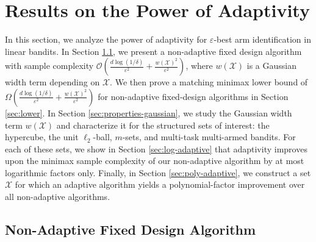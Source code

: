 

\section{Results on the Power of Adaptivity}\label{sec:non-adaptive}
In this section, we analyze the power of adaptivity for $\varepsilon$-best arm identification in linear bandits. In Section \ref{sec:upper}, we present a non-adaptive fixed design algorithm with sample complexity $\mathcal{O}\!\left(\frac{d\log(1/\delta)}{\varepsilon^2}+\frac{w(\mathcal{X})^2}{\varepsilon^2}\right)$, where $w(\mathcal{X})$ is a Gaussian width term depending on $\mathcal{X}$. We then prove a matching minimax lower bound of $\Omega\!\left(\frac{d\log(1/\delta)}{\varepsilon^2}+\frac{w(\mathcal{X})^2}{\varepsilon^2}\right)$ for non-adaptive fixed-design algorithms in Section \ref{sec:lower}. In Section \ref{sec:properties-gaussian}, we study the Gaussian width term $w(\mathcal{X})$ and characterize it for the structured sets of interest: the hypercube, the unit $\ell_2$-ball, $m$-sets, and multi-task multi-armed bandits. For each of these sets, we show in Section \ref{sec:log-adaptive} that adaptivity improves upon the minimax sample complexity of our non-adaptive algorithm by at most logarithmic factors only. Finally, in Section \ref{sec:poly-adaptive}, we construct a set $\mathcal{X}$ for which an adaptive algorithm yields a polynomial-factor improvement over all non-adaptive algorithms.

\subsection{Non-Adaptive Fixed Design Algorithm}\label{sec:upper}

